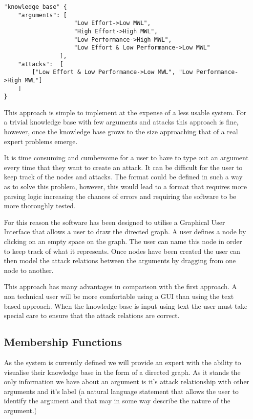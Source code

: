 \begin{lstlisting}
"knowledge_base" {
    "arguments": [
                    "Low Effort->Low MWL", 
                    "High Effort->High MWL", 
                    "Low Performance->High MWL", 
                    "Low Effort & Low Performance->Low MWL"
                ],
    "attacks":  [
        ["Low Effort & Low Performance->Low MWL", "Low Performance->High MWL"]
    ]
}
\end{lstlisting}

This approach is simple to implement at the expense of a less usable system. For a trivial knowledge base with few arguments and attacks this approach is fine, however, once the knowledge base grows to the size approaching that of a real expert problems emerge.

It is time consuming and cumbersome for a user to have to type out an argument every time that they want to create an attack. It can be difficult for the user to keep track of the nodes and attacks. The format could be defined in such a way as to solve this problem, however, this would lead to a format that requires more parsing logic increasing the chances of errors and requiring the software to be more thoroughly tested.

For this reason the software has been designed to utilise a Graphical User Interface that allows a user to draw the directed graph. A user defines a node by clicking on an empty space on the graph. The user can name this node in order to keep track of what it represents. Once nodes have been created the user can then model the attack relations between the arguments by dragging from one node to another.

This approach has many advantages in comparison with the first approach. A non technical user will be more comfortable using a GUI than using the text based approach. When the knowledge base is input using text the user must take special care to ensure that the attack relations are correct.

\subsection{Membership Functions}

As the system is currently defined we will provide an expert with the ability to visualise their knowledge base in the form of a directed graph. As it stands the only information we have about an argument is it's attack relationship with other arguments and it's label (a natural language statement that allows the user to identify the argument and that may in some way describe the nature of the argument.) 

